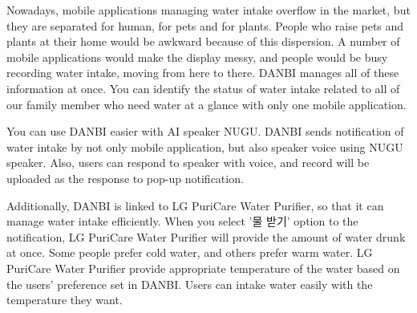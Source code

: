 \documentclass[conference]{IEEEtran}
\begin{document}
Nowadays, mobile applications managing water intake overflow in the market, but they are separated for human, for pets and for plants. People who raise pets and plants at their home would be awkward because of this dispersion. A number of mobile applications would make the display messy, and people would be busy recording water intake, moving from here to there. DANBI manages all of these information at once. You can identify the status of water intake related to all of our family member who need water at a glance with only one mobile application.

You can use DANBI easier with AI speaker NUGU. DANBI sends notification of water intake by not only mobile application, but also speaker voice using NUGU speaker. Also, users can respond to speaker with voice, and record will be uploaded as the response to pop-up notification.

Additionally, DANBI is linked to LG PuriCare Water Purifier, so that it can manage water intake efficiently. When you select '물 받기' option to the notification, LG PuriCare Water Purifier will provide the amount of water drunk at once. Some people prefer cold water, and others prefer warm water. LG PuriCare Water Purifier provide appropriate temperature of the water based on the users' preference set in DANBI. Users can intake water easily with the temperature they want.

\ 
\end{document}
